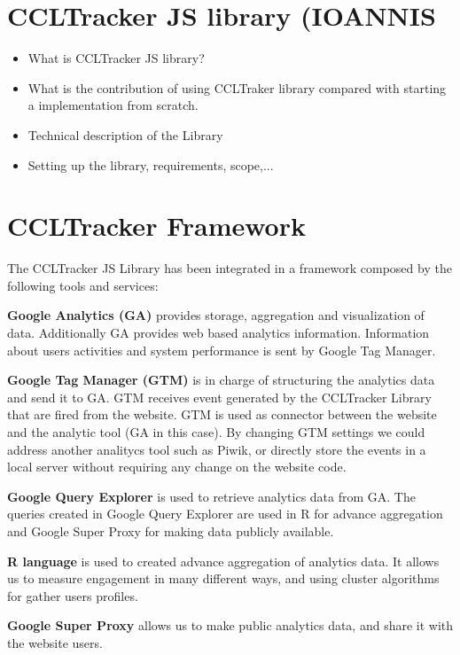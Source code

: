 \documentclass{article}
\begin{document}
\section{CCLTracker JS library (IOANNIS}

\begin{itemize}
\item What is CCLTracker JS library?
\item What is the contribution of using CCLTraker library compared with starting a implementation from scratch. 
\item Technical description of the Library
\item Setting up the library, requirements, scope,...

\end{itemize}


\section{CCLTracker Framework}\label{sec:CCLtrackerFramerwork}

The CCLTracker JS Library has been integrated in a framework composed by the following tools and services:

\textbf{Google Analytics (GA)} provides storage, aggregation and visualization of data. Additionally GA provides web based analytics information. Information about users activities and system performance is sent by Google Tag Manager. 

\textbf{Google Tag Manager (GTM)} is in charge of structuring the analytics data and send it to GA. GTM receives event generated by the CCLTracker Library that are fired from the website. GTM is used as connector between the website and the analytic tool (GA in this case). By changing GTM settings we could address another analitycs tool such as Piwik, or directly store the events in a local server without requiring any change on the website code. 

\textbf{Google Query Explorer} is used to retrieve analytics data from GA. The queries created in Google Query Explorer are used in R for advance aggregation and Google Super Proxy for making data publicly available. 

\textbf{R language} is used to created advance aggregation of analytics data. It allows us to measure engagement in many different ways, and using cluster algorithms for gather users profiles. 

\textbf{Google Super Proxy} allows us to make public analytics data, and share it with the website users. 
\end{document}
